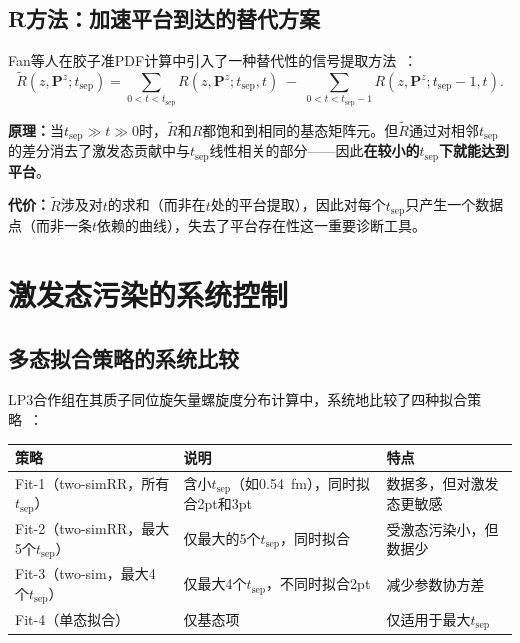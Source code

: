 \documentclass[12pt,a4paper]{ctexart}
\theoremstyle{definition}
\begin{document}
\subsection{R̃方法：加速平台到达的替代方案}

Fan等人在胶子准PDF计算中引入了一种替代性的信号提取方法~\cite{correlationFunctions2026}：
\begin{equation}\label{eq:R_tilde}
    \tilde{R}(z, \mathbf{P}^z; t_{\text{sep}}) =
    \sum_{0 < t < t_{\text{sep}}} R(z, \mathbf{P}^z; t_{\text{sep}}, t) \;-\;
    \sum_{0 < t < t_{\text{sep}}-1} R(z, \mathbf{P}^z; t_{\text{sep}}-1, t).
\end{equation}

\textbf{原理：}当$t_{\text{sep}} \gg t \gg 0$时，$\tilde{R}$和$R$都饱和到相同的基态矩阵元。但$\tilde{R}$通过对相邻$t_{\text{sep}}$的差分消去了激发态贡献中与$t_{\text{sep}}$线性相关的部分——因此\textbf{在较小的$t_{\text{sep}}$下就能达到平台}。

\textbf{代价：}$\tilde{R}$涉及对$t$的求和（而非在$t$处的平台提取），因此对每个$t_{\text{sep}}$只产生一个数据点（而非一条$t$依赖的曲线），失去了平台存在性这一重要诊断工具。

\section{激发态污染的系统控制}

\subsection{多态拟合策略的系统比较}

LP3合作组在其质子同位旋矢量螺旋度分布计算中，系统地比较了四种拟合策略~\cite{correlationFunctions2026}：

\begin{center}
\begin{tabular}{lll}
\toprule
\textbf{策略} & \textbf{说明} & \textbf{特点} \\
\midrule
Fit-1（two-simRR，所有$t_{\text{sep}}$） & 含小$t_{\text{sep}}$（如0.54~fm），同时拟合2pt和3pt & 数据多，但对激发态更敏感 \\
Fit-2（two-simRR，最大5个$t_{\text{sep}}$） & 仅最大的5个$t_{\text{sep}}$，同时拟合 & 受激态污染小，但数据少 \\
Fit-3（two-sim，最大4个$t_{\text{sep}}$） & 仅最大4个$t_{\text{sep}}$，不同时拟合2pt & 减少参数协方差 \\
Fit-4（单态拟合） & 仅基态项 & 仅适用于最大$t_{\text{sep}}$ \\
\bottomrule
\end{tabular}
\end{center}
\end{document}
